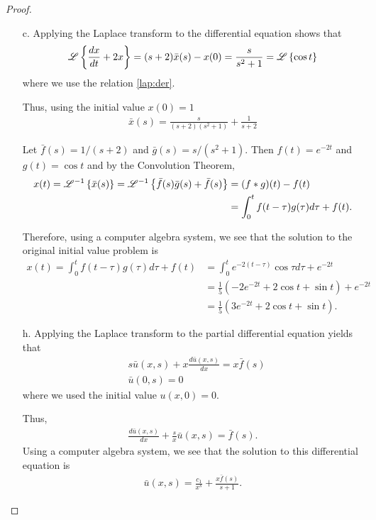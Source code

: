 \begin{proof}
\begin{enumerate}
    \item[c.] Applying the Laplace transform to the differential equation shows that
      \begin{align*}
        \mathscr{L}\left\{ {\frac{dx}{dt} + 2x} \right\} = (s+2)\bar{x}(s) - x(0) = \frac{s}{s^2 + 1} = \mathscr{L}\left\{ {\cos t} \right\}
      \end{align*}
      where we use the relation \eqref{lap:der}.

      Thus, using the initial value $x(0) = 1$
      \begin{align*}
        \bar{x}(s) = \frac{s}{(s+2)(s^2 + 1)} + \frac{1}{s+2}
      \end{align*}

      Let $\bar{f}(s) = 1/(s+2)$ and $\bar{g}(s) = s/(s^2+1)$.
      Then $f(t) = e^{-2t}$ and $g(t) = \cos t$ and by the Convolution Theorem,
      \begin{align*}
        x(t) = \mathscr{L}^{-1}\left\{ {\bar{x}(s)} \right\} = \mathscr{L}^{-1}\left\{ {\bar{f}(s)\bar{g}(s) + \bar{f}(s)} \right\}
        &= (f\ast g)(t) - f(t)\\
        &= \int_0^t f(t-\tau) g(\tau) d\tau + f(t).
      \end{align*}

      Therefore, using a computer algebra system, we see that
      the solution to the original initial value problem is
      \begin{align*}
        x(t) = \int_0^t f(t-\tau) g(\tau) d\tau + f(t)
        &= \int_0^t e^{-2(t-\tau)}\cos \tau d\tau + e^{-2t}\\
        &= \frac{1}{5}\left(-2 e^{-2t} + 2\cos t + \sin t\right) + e^{-2t}\\
        &= \frac{1}{5}\left(3 e^{-2t} + 2\cos t + \sin t\right).
      \end{align*}

    \item[h.] Applying the Laplace transform
      to the partial differential equation yields that
      \begin{align*}
        &s\bar{u}(x, s) + x\frac{d \bar{u}(x, s)}{d x} = x\bar{f}(s) \\
        &\bar{u}(0, s) = 0
      \end{align*}
      where we used the initial value $u(x, 0) = 0$.

      Thus,
      \begin{align*}
        \frac{d\bar{u}(x, s)}{dx} + \frac{s}{x}\bar{u}(x, s) = \bar{f}(s).
      \end{align*}
      Using a computer algebra system, we see that the solution to this differential equation is
      \begin{align*}
        \bar{u}(x, s) = \frac{c_1}{x^s}+ \frac{x\bar{f}(s)}{s+1}.
      \end{align*}


\end{enumerate}
\end{proof}
